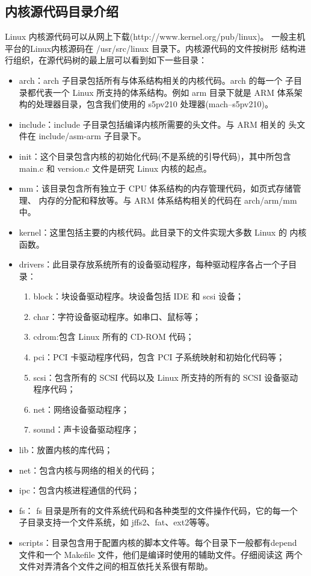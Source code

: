 \subsection{内核源代码目录介绍}
	Linux 内核源代码可以从网上下载(http://www.kernel.org/pub/linux)。
一般主机平台的Linux内核源码在 /usr/src/linux 目录下。内核源代码的文件按树形
结构进行组织，在源代码树的最上层可以看到如下一些目录：
\begin{itemize}\itemsep=-3pt
  \item arch：arch 子目录包括所有与体系结构相关的内核代码。arch 的每一个
		子目录都代表一个 Linux 所支持的体系结构。例如 arm 目录下就是 ARM
		体系架构的处理器目录，包含我们使用的 s5pv210 处理器(mach--s5pv210)。
  \item include：include 子目录包括编译内核所需要的头文件。与 ARM 相关的
		头文件在 include/asm-arm 子目录下。
  \item init：这个目录包含内核的初始化代码(不是系统的引导代码)，其中所包含
		main.c 和 version.c 文件是研究 Linux 内核的起点。
  \item mm：该目录包含所有独立于 CPU 体系结构的内存管理代码，如页式存储管理、
		内存的分配和释放等。与 ARM 体系结构相关的代码在 arch/arm/mm 中。
  \item kernel：这里包括主要的内核代码。此目录下的文件实现大多数 Linux 的
		内核函数。
  \item drivers：此目录存放系统所有的设备驱动程序，每种驱动程序各占一个子目录：
  \begin{enumerate}\itemsep=-3pt
  \item block：块设备驱动程序。块设备包括 IDE 和 scsi 设备；
  \item char：字符设备驱动程序。如串口、鼠标等；
  \item cdrom:包含 Linux 所有的 CD-ROM 代码；
  \item pci：PCI 卡驱动程序代码，包含 PCI 子系统映射和初始化代码等；
  \item scsi：包含所有的 SCSI 代码以及 Linux 所支持的所有的 SCSI 设备驱动
		程序代码；
  \item net：网络设备驱动程序；
  \item sound：声卡设备驱动程序；
  \end{enumerate}
  \item lib：放置内核的库代码；
  \item net：包含内核与网络的相关的代码；
  \item ipc：包含内核进程通信的代码；
  \item fs： fs 目录是所有的文件系统代码和各种类型的文件操作代码，它的每一个
		子目录支持一个文件系统，如 jffs2、fat、ext2等等。
  \item scripts：目录包含用于配置内核的脚本文件等。每个目录下一般都有depend
		文件和一个 Makefile 文件，他们是编译时使用的辅助文件。仔细阅读这
		两个文件对弄清各个文件之间的相互依托关系很有帮助。
\end{itemize}

